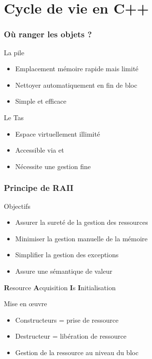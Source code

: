 \documentclass[svgnames]{beamer}
\begin{document}
\section{Cycle de vie en C++}
\frame
{
  \frametitle{Où ranger les objets ?}
  \begin{block}{La pile}
  \begin{itemize}
  \item Emplacement mémoire rapide mais limité
  \item Nettoyer automatiquement en fin de bloc
  \item Simple et efficace
  \end{itemize}
  \end{block}


  \begin{block}{Le Tas}
  \begin{itemize}
  \item Espace virtuellement illimité
  \item Accessible via  et 
  \item Nécessite une gestion fine
  \end{itemize}
  \end{block}
}

\frame
{
  \frametitle{Principe de RAII}
  \begin{block}{Objectifs}
  \begin{itemize}\footnotesize
  \item Assurer la sureté de la gestion des ressources
  \item Minimiser la gestion manuelle de la mémoire
  \item Simplifier la gestion des exceptions
  \item Assure une sémantique de valeur
  \end{itemize}
  \end{block}
  
  \begin{center}
  \textbf{R}esource \textbf{A}cquisition \textbf{I}s \textbf{I}nitialisation
  \end{center}

  \begin{block}{Mise en \oe{uvre}}
  \begin{itemize}\footnotesize
  \item Constructeurs = prise de ressource
  \item Destructeur = libération de ressource
  \item Gestion de la ressource au niveau du bloc
  \end{itemize}
  \end{block}
}
\end{document}
